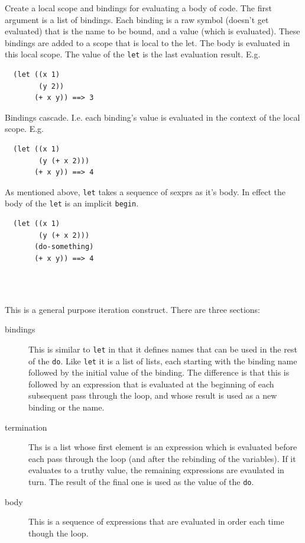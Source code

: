 \documentclass[12pt]{article}
\begin{document}
Create a local scope and bindings for evaluating a body of code. The
first argument is a list of bindings. Each binding is a raw symbol
(doesn't get evaluated) that is the name to be bound, and a value
(which is evaluated). These bindings are added to a scope that is
local to the let. The body is evaluated in this local scope. The value
of the \verb|let| is the last evaluation result. E.g.

\begin{verbatim}
  (let ((x 1)
        (y 2))
       (+ x y)) ==> 3
\end{verbatim}

Bindings cascade. I.e. each binding's value is evaluated in the
context of the local scope. E.g.

\begin{verbatim}
  (let ((x 1)
        (y (+ x 2)))
       (+ x y)) ==> 4
\end{verbatim}

As mentioned above, \verb|let| takes a sequence of sexprs as it's
body. In effect the body of the \verb|let| is an implicit
\verb|begin|.

\begin{verbatim}
  (let ((x 1)
        (y (+ x 2)))
       (do-something)
       (+ x y)) ==> 4
\end{verbatim}

\\
\\

This is a general purpose iteration construct. There are three
sections: 

\begin{description}
\item[bindings] This is similar to \verb|let| in that it defines names
  that can be used in the rest of the \verb|do|. Like \verb|let| it
  is a list of lists, each starting with the binding name followed by
  the initial value of the binding. The difference is that this is
  followed by an expression that is evaluated at the beginning of each
  subsequent pass through the loop, and whose result is used as a new
  binding or the name.
\item[termination] Ths is a list whose first element is an expression
 which is evaluated before each pass through the loop (and after the
 rebinding of the variables). If it evaluates to a truthy value, the
 remaining expressions are evaulated in turn. The result of the final
 one is used as the value of the \verb|do|.
\item[body] This is a sequence of expressions that are evaluated in
  order each time though the loop.
\end{description}
\end{document}
